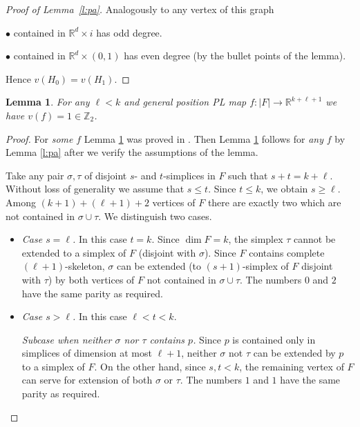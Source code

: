 \documentclass[runningheads]{llncs}
\newtheorem{lemma}[theorem]{Lemma}
\theoremstyle{remark}
\theoremstyle{definition}
\newcommand{\R}{\mathbb{R}}
\newcommand{\Z}{\mathbb{Z}}
\begin{document}
{\begin{proof}[Proof of Lemma~\ref{l:pa}]
Analogously to \cite[Lemma 11.4]{Hu69}  any vertex of this graph

$\bullet$ contained in $\R^d\times i$ has odd degree.

$\bullet$ contained in $\R^d\times(0,1)$ has even degree (by the bullet points of the lemma).

Hence $v(H_0)=v(H_1)$.
\end{proof}

\begin{lemma}
\label{l:odd_obstruction}
For any $\ell<k$ and general position PL map $f\colon |F| \to \R^{k + \ell + 1}$ we have $v(f)=1\in\Z_2$.
\end{lemma}

\begin{proof}
For {\it some} $f$ Lemma \ref{l:odd_obstruction} was proved in \cite[Lemma~1.1]{SeSp92}.
Then Lemma \ref{l:odd_obstruction} follows for {\it any} $f$ by Lemma \ref{l:pa} after we verify the assumptions
of the lemma.

Take any pair $\sigma, \tau$ of disjoint $s$- and $t$-simplices in $F$ such that $s+t=k + \ell$.
Without loss of generality we assume that $s\le t$.
Since $t\le k$, we obtain $s\ge\ell$.
Among $(k+1)+(\ell+1)+2$ vertices of $F$ there are exactly two which are not contained in $\sigma\cup\tau$.
We distinguish two cases.

\begin{itemize}
\item {\it Case $s=\ell$.} In this case $t=k$.
Since $\dim F = k$, the simplex $\tau$ cannot be extended to a simplex of $F$ (disjoint with $\sigma$).
Since $F$ contains complete $(\ell + 1)$-skeleton, $\sigma$ can be extended (to $(s+1)$-simplex of $F$ disjoint with $\tau$) by both vertices of $F$ not contained in $\sigma\cup\tau$.
The numbers $0$ and $2$ have the same parity as required.

\item {\it Case $s>\ell$.} In this case $\ell <t< k$.


{\it Subcase when neither $\sigma$ nor $\tau$ contains $p$.} Since $p$ is contained only in simplices of dimension at most $\ell + 1$, neither $\sigma$ not $\tau$ can be extended by $p$ to a simplex of $F$.
On the other hand, since $s,t< k$, the remaining vertex of $F$ can serve for extension of both $\sigma$ or $\tau$.
The numbers $1$ and $1$ have the same parity as required.


\end{itemize}
\end{proof}}
\end{document}
